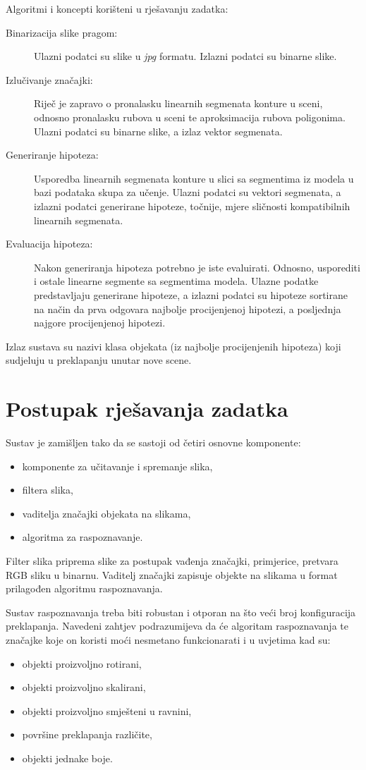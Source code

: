 \documentclass[lmodern, utf8, seminar, numeric]{fer}
\begin{document}
Algoritmi i koncepti korišteni u rješavanju zadatka:
\begin{description}
\item[Binarizacija slike pragom:] Ulazni podatci su slike u \emph{jpg} formatu. Izlazni podatci su binarne slike.
\item[Izlučivanje značajki:]  Riječ je zapravo o pronalasku linearnih segmenata konture u sceni, odnosno pronalasku rubova u sceni te aproksimacija rubova poligonima. Ulazni podatci su binarne slike, a izlaz vektor segmenata.
\item[Generiranje hipoteza:] Usporedba linearnih segmenata konture u slici sa segmentima iz modela u bazi podataka skupa za učenje. Ulazni podatci su vektori segmenata, a izlazni podatci generirane hipoteze, točnije, mjere sličnosti kompatibilnih linearnih segmenata.
\item[Evaluacija hipoteza:] Nakon generiranja hipoteza potrebno je iste evaluirati. Odnosno, usporediti i ostale linearne segmente sa segmentima modela. Ulazne podatke predstavljaju generirane hipoteze, a izlazni podatci su hipoteze sortirane na način da prva odgovara najbolje procijenjenoj hipotezi, a posljednja najgore procijenjenoj hipotezi.
\end{description}

Izlaz sustava su nazivi klasa objekata (iz najbolje procijenjenih hipoteza) koji sudjeluju u preklapanju unutar nove scene.

\chapter{Postupak rješavanja zadatka}

Sustav je zamišljen tako da se sastoji od četiri osnovne komponente:
\begin{itemize}
\item komponente za učitavanje i spremanje slika,
\item filtera slika,
\item vaditelja značajki objekata na slikama,
\item algoritma za raspoznavanje.
\end{itemize}

Filter slika priprema slike za postupak vađenja značajki, primjerice, pretvara RGB sliku u binarnu. Vaditelj značajki zapisuje objekte na slikama u format prilagođen algoritmu raspoznavanja.

Sustav raspoznavanja treba biti robustan i otporan na što veći broj konfiguracija preklapanja. Navedeni zahtjev podrazumijeva da će algoritam raspoznavanja te značajke koje on koristi moći nesmetano funkcionarati i u uvjetima kad su:
\begin{itemize}
\item objekti proizvoljno rotirani,
\item objekti proizvoljno skalirani,
\item objekti proizvoljno smješteni u ravnini,
\item površine preklapanja različite,
\item objekti jednake boje.
\end{itemize}
\end{document}
